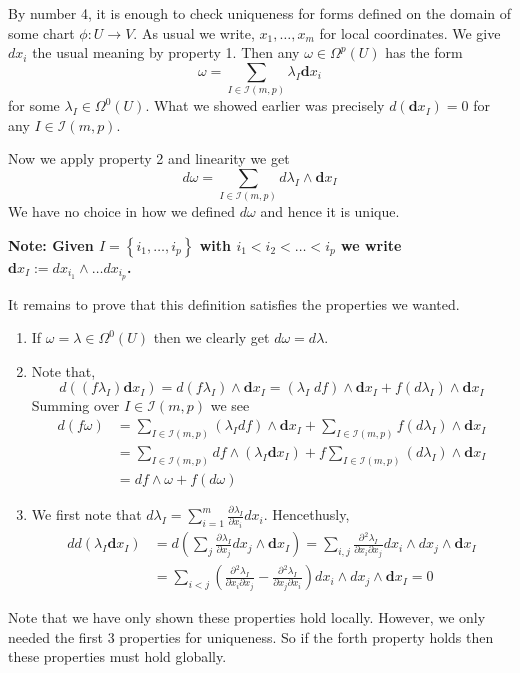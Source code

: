 \documentclass[11pt]{article}
\newcommand{\defeq}{:=}
\newcommand*{\pd}[3][]{\ensuremath{\frac{\partial^{#1} {#2}}{\partial {#3}^{#1}}}}
\newcommand{\mv}[1]{\textbf{#1}}
\newenvironment{note}
	{\begin{mdframed}[backgroundcolor=white, linecolor=RubineRed, roundcorner=5pt, linewidth=1pt]\bfseries{Note:}\normalfont
	\setlength{\parindent}{0pt}}
	{\end{mdframed}}
\begin{document}
By number 4, it is enough to check uniqueness for forms defined on the domain of some chart $\phi: U \to V$.
As usual we write, $x_1, \dots , x_m$ for local coordinates.
We give $dx_i$ the usual meaning by property 1.
Then any $\omega\in\Omega^p(U)$ has the form
\[
	\omega = \sum_{I\in\mathcal{I}(m, p)}\lambda_I \mv{d}x_i
\]
for some $\lambda_I\in \Omega^0(U)$.
What we showed earlier was precisely $d(\mv{d}x_I)=0$ for any $I\in\mathcal{I}(m, p)$.

Now we apply property 2 and linearity we get
\[
	d\omega = \sum_{I\in\mathcal{I}(m, p)}d\lambda_I \wedge \mv{d}x_I
\]
We have no choice in how we defined $d\omega$ and hence it is unique.

\begin{note}
Given $I=\left\{ i_1, \dots, i_p\right\}$ with $i_1 < i_2 < \dots < i_p$ we write $\mv{d}x_I\defeq dx_{i_1} \wedge \dots dx_{i_p}$.
\end{note}

It remains to prove that this definition satisfies the properties we wanted.

\begin{enumerate}
	\item If $\omega = \lambda\in\Omega^0(U)$ then we clearly get $d\omega = d\lambda$.
	\item Note that, 
		\[
 d((f\lambda_I)\mv{d}x_I)=d(f\lambda_I) \wedge \mv{d}x_I = (\lambda_I\; df) \wedge \mv{d}x_I + f(d\lambda_I) \wedge \mv{d}x_I
		\]
		Summing over $I\in\mathcal{I}(m, p)$ we see
		\begin{align*}
			d(f\omega) &= \sum_{I\in\mathcal{I}(m, p)}(\lambda_I df) \wedge \mv{d}x_I + \sum_{I\in\mathcal{I}(m, p)}f(d\lambda_I)\wedge \mv{d}x_I\\
					   & = \sum_{I\in\mathcal{I}(m, p)}df \wedge (\lambda_I\mv{d}x_I) + f\sum_{I\in\mathcal{I}(m, p)}(d\lambda_I)\wedge \mv{d}x_I\\ 
					   & = df \wedge \omega + f (d\omega)
		\end{align*}
	\item We first note that $d\lambda_I=\sum_{i=1}^m \pd{\lambda_I}{x_i}dx_i$.
		Hencethusly,
		\begin{align*}
			dd(\lambda_I\mv{d}x_I)&=d\left( \sum_{j}\pd{\lambda_I}{x_j}dx_j \wedge \mv{d}x_I\right) =  \sum_{i, j}\pd{^2 \lambda_I}{x_i\partial x_j}dx_i \wedge dx_j \wedge \mv{d}x_I \\
								  &=\sum_{i < j}\left( \pd{^2\lambda_I}{x_i\partial x_j}- \pd{^2\lambda_I}{x_j \partial x_i} \right)dx_i \wedge dx_j \wedge \mv{d}x_I = 0
		\end{align*}
\end{enumerate}

Note that we have only shown these properties hold locally.
However, we only needed the first 3 properties for uniqueness.
So if the forth property holds then these properties must hold globally.
\end{document}
